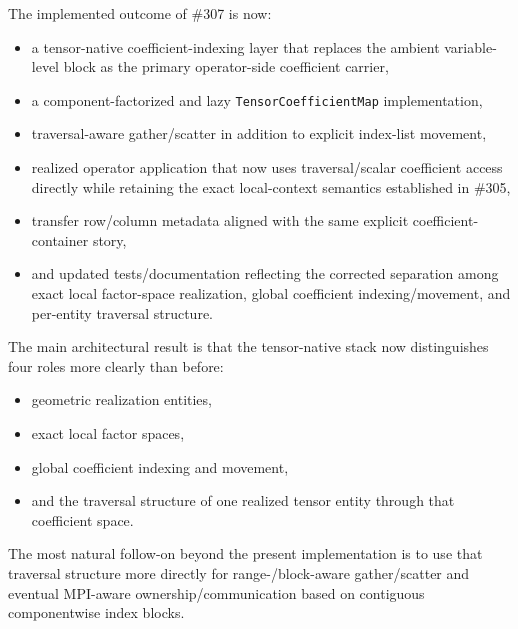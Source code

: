 \documentclass[11pt]{article}
\begin{document}
The implemented outcome of \#307 is now:
\begin{itemize}[leftmargin=2em]
\item a tensor-native coefficient-indexing layer that replaces the ambient variable-level block as the primary operator-side coefficient carrier,
\item a component-factorized and lazy \texttt{TensorCoefficientMap} implementation,
\item traversal-aware gather/scatter in addition to explicit index-list movement,
\item realized operator application that now uses traversal/scalar coefficient access directly while retaining the exact local-context semantics established in \#305,
\item transfer row/column metadata aligned with the same explicit coefficient-container story,
\item and updated tests/documentation reflecting the corrected separation among exact local factor-space realization, global coefficient indexing/movement, and per-entity traversal structure.
\end{itemize}

The main architectural result is that the tensor-native stack now distinguishes four roles more clearly than before:
\begin{itemize}[leftmargin=2em]
\item geometric realization entities,
\item exact local factor spaces,
\item global coefficient indexing and movement,
\item and the traversal structure of one realized tensor entity through that coefficient space.
\end{itemize}

The most natural follow-on beyond the present implementation is to use that traversal structure more directly for range-/block-aware gather/scatter and eventual MPI-aware ownership/communication based on contiguous componentwise index blocks.
\end{document}
